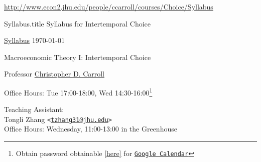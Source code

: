 \documentclass{\econtex}\newcommand{\texname}{Syllabus}
\begin{document}
\large
\begin{center}{{\tiny \url{http://www.econ2.jhu.edu/people/ccarroll/courses/Choice/Syllabus}}}\end{center}


\begin{verbatimwrite}{\texname.title}
Syllabus for Intertemporal Choice
\end{verbatimwrite}

\thispagestyle{empty}

\newenvironment{blockpar}{\par\begin{minipage}{\textwidth}
\setlength{\parskip}{.5\baselineskip plus 1pt minus 1pt}}{\end{minipage}}

\pagestyle{plain}
\thispagestyle{empty}

\begin{center}
{\tiny \href{http://www.econ2.jhu.edu/people/ccarroll/courses/Choice/Syllabus.pdf}{\texname} \hfill \today}


{\LARGE Macroeconomic Theory I: Intertemporal Choice}
\medskip\medskip
\medskip\medskip

\smallskip


Professor \href{http://www.econ2.jhu.edu/people/ccarroll}{Christopher D. Carroll}

\medskip

\medskip\medskip
Office Hours: Tue 17:00-18:00, Wed 14:30-16:00\footnote{
Obtain password obtainable \href{https://www.econ2.jhu.edu/people/ccarroll/private/PasswordForCarrollCDCApptsAccount.txt}{[here]} for \texttt{\href{http://www.econ2.jhu.edu/people/ccarroll/calendar.html}{Google Calendar}}}

\medskip\medskip\medskip
\small
Teaching Assistant:  \\
Tongli Zhang \texttt{<\href{mailto:tzhang31@jhu.edu}{\texttt{tzhang31@jhu.edu}}>}
\\ Office Hours: Wednesday, 11:00-13:00 in the Greenhouse
\normalsize
\medskip

\end{center}
\end{document}
